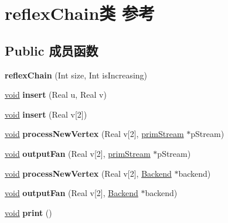\hypertarget{classreflex_chain}{}\section{reflex\+Chain类 参考}
\label{classreflex_chain}
\subsection*{Public 成员函数}
\begin{DoxyCompactItemize}
\item 
\mbox{\label{classreflex_chain_a32be8a1d8819ed8c9a6c5dbcd33a393d}} 
{\bfseries reflex\+Chain} (Int size, Int is\+Increasing)
\item 
\mbox{\label{classreflex_chain_afaf6b48c7514315e241dbda331f98bcd}} 
\hyperlink{interfacevoid}{void} {\bfseries insert} (Real u, Real v)
\item 
\mbox{\label{classreflex_chain_a31e6be9cd8767ec8751da80754824293}} 
\hyperlink{interfacevoid}{void} {\bfseries insert} (Real v\mbox{[}2\mbox{]})
\item 
\mbox{\label{classreflex_chain_a96bfc26f0c50dca6101978d614788734}} 
\hyperlink{interfacevoid}{void} {\bfseries process\+New\+Vertex} (Real v\mbox{[}2\mbox{]}, \hyperlink{classprim_stream}{prim\+Stream} $\ast$p\+Stream)
\item 
\mbox{\label{classreflex_chain_a73b500ac93414b9b74f7a3283edcbfaa}} 
\hyperlink{interfacevoid}{void} {\bfseries output\+Fan} (Real v\mbox{[}2\mbox{]}, \hyperlink{classprim_stream}{prim\+Stream} $\ast$p\+Stream)
\item 
\mbox{\label{classreflex_chain_a2573feff7e91b11e9f2807250a9a4ef9}} 
\hyperlink{interfacevoid}{void} {\bfseries process\+New\+Vertex} (Real v\mbox{[}2\mbox{]}, \hyperlink{class_backend}{Backend} $\ast$backend)
\item 
\mbox{\label{classreflex_chain_a26132dbb11a91244bc61d9619f6f39db}} 
\hyperlink{interfacevoid}{void} {\bfseries output\+Fan} (Real v\mbox{[}2\mbox{]}, \hyperlink{class_backend}{Backend} $\ast$backend)
\item 
\mbox{\label{classreflex_chain_a665b651a72ced11a9301ef07d68f96ad}} 
\hyperlink{interfacevoid}{void} {\bfseries print} ()
\end{DoxyCompactItemize}


